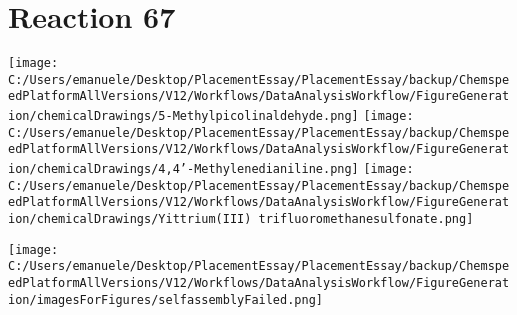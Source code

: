 \documentclass{article}%
\begin{document}
\section*{Reaction 67}%
%
\begin{scheme}[H]%
\begin{minipage}{0.5\textwidth}%
\texttt{[image: C:/Users/emanuele/Desktop/PlacementEssay/PlacementEssay/backup/ChemspeedPlatformAllVersions/V12/Workflows/DataAnalysisWorkflow/FigureGeneration/chemicalDrawings/5-Methylpicolinaldehyde.png]}%
\texttt{[image: C:/Users/emanuele/Desktop/PlacementEssay/PlacementEssay/backup/ChemspeedPlatformAllVersions/V12/Workflows/DataAnalysisWorkflow/FigureGeneration/chemicalDrawings/4,4'-Methylenedianiline.png]}%
\texttt{[image: C:/Users/emanuele/Desktop/PlacementEssay/PlacementEssay/backup/ChemspeedPlatformAllVersions/V12/Workflows/DataAnalysisWorkflow/FigureGeneration/chemicalDrawings/Yittrium(III) trifluoromethanesulfonate.png]}%
\end{minipage}%
\begin{minipage}{0.5\textwidth}%
\begin{center}%
\texttt{[image: C:/Users/emanuele/Desktop/PlacementEssay/PlacementEssay/backup/ChemspeedPlatformAllVersions/V12/Workflows/DataAnalysisWorkflow/FigureGeneration/imagesForFigures/selfassemblyFailed.png]}%
\end{center}%
\end{minipage}%
\caption{Self-assembly of components 3, 17, with Yittrium(III) in a 3.0:1.5:1.0 molar ratio in CH$_3$CN at 60\textdegree C for 40h. These are the reagents (starting materials) for reaction 67.}%
\end{scheme}%
\end{document}
